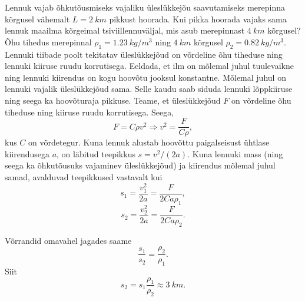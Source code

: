 
Lennuk vajab õhkutõusmiseks vajaliku üleslükkejõu saavutamiseks merepinna kõrgusel vähemalt $L=\SI{2}{km}$ pikkust hoorada. Kui pikka hoorada vajaks sama lennuk maailma kõrgeimal tsiviillennuväljal, mis asub merepinnast $\SI{4}{km}$ kõrgusel? Õhu tihedus merepinnal $\rho_1 = \SI{1,23}{kg/m^3}$ ning $\SI{4}{km}$ kõrgusel $\rho_2 = \SI{0,82 }{kg/m^3}$. Lennuki tiibade poolt tekitatav üleslükkejõud on võrdeline õhu tiheduse ning lennuki kiiruse ruudu korrutisega. Eeldada, et ilm on mõlemal juhul tuulevaikne ning lennuki kiirendus on kogu hoovõtu jooksul konstantne.\hint
Mõlemal juhul on lennuki vajalik üleslükkejõud sama. Selle kaudu saab siduda lennuki lõppkiiruse ning seega ka hoovõturaja pikkuse.\solu
Teame, et üleslükkejõud $F$ on võrdeline õhu tiheduse ning kiiruse ruudu korrutisega. Seega, 
$$F=C\rho v^2 \Rightarrow v^2=\frac{F}{C\rho},$$
kus $C$ on võrdetegur. Kuna lennuk alustab hoovõttu paigalseisust ühtlase kiirendusega $a$, on läbitud teepikkus $s=v^2/(2a)$. Kuna lennuki mass (ning seega ka õhkutõusuks vajaminev üleslükkejõud) ja kiirendus mõlemal juhul samad, avalduvad teepikkused vastavalt kui
$$s_1=\frac{v_1^2}{2a}=\frac{F}{2Ca\rho_1},$$ 
$$s_2=\frac{v_2^2}{2a}=\frac{F}{2Ca\rho_2}.$$   

Võrrandid omavahel jagades saame
$$\frac{s_1}{s_2}=\frac{\rho_2}{\rho_1}.$$ 
Siit 
\[
s_2 = s_1\frac{\rho_1}{\rho_2} \approx \SI{3}{km}.
\]\probend